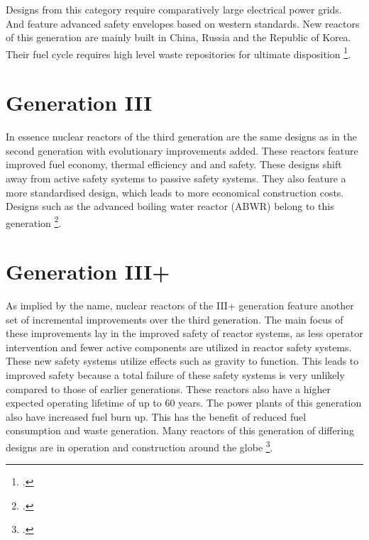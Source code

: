 Designs from this category require comparatively large electrical power grids. And feature advanced
safety envelopes based on western standards. New reactors of this generation are mainly built in
China, Russia and the Republic of Korea. Their fuel cycle requires high level waste repositories
for ultimate disposition \footcite[4-6]{Gen2gen}.
\section{Generation III}
In essence nuclear reactors of the third generation are the same designs as in the second generation
with evolutionary improvements added. These reactors feature improved fuel economy, thermal efficiency and
and safety. These designs shift away from active safety systems to passive safety systems. They also
feature a more standardised design, which leads to more economical construction costs. Designs such
as the advanced boiling water reactor (ABWR) belong to this generation \footcite[5,6]{Gen2gen}.
\section{Generation III+}
As implied by the name, nuclear reactors of the III+ generation feature another set of incremental improvements over the third
generation. The main focus of these improvements lay in the improved safety of reactor systems, as
less operator intervention and fewer active components are utilized in reactor safety systems. These
new safety systems utilize effects such as gravity to function. This leads to improved safety because a
total failure of these safety systems is very unlikely compared to those of earlier generations.
These reactors also have a higher expected operating lifetime of up to 60 years. The power plants of
this generation also have increased fuel burn up. This has the benefit of reduced fuel consumption
and waste generation. Many reactors of this generation of differing designs are in operation
and construction around the globe \footcite[7-11]{Gen2gen}.